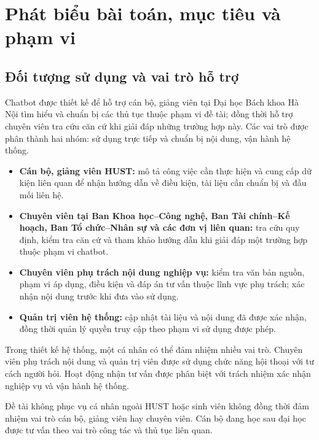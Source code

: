 \section{Phát biểu bài toán, mục tiêu và phạm vi}
\label{sec:bai-toan}
\subsection{Đối tượng sử dụng và vai trò hỗ trợ}
Chatbot được thiết kế để hỗ trợ cán bộ, giảng viên tại Đại học Bách khoa
Hà Nội tìm hiểu và chuẩn bị các thủ tục thuộc phạm vi đề tài; đồng thời
hỗ trợ chuyên viên tra cứu căn cứ khi giải đáp những trường hợp này.
Các vai trò được phân thành hai nhóm: sử dụng trực tiếp và chuẩn bị nội
dung, vận hành hệ thống.

\begin{itemize}[leftmargin=*,itemsep=2pt,topsep=3pt,before={}]
\item \textbf{Cán bộ, giảng viên HUST:} mô tả công việc cần thực hiện và cung
 cấp dữ kiện liên quan để nhận hướng dẫn về điều kiện, tài liệu cần chuẩn
 bị và đầu mối liên hệ.
\item \textbf{Chuyên viên tại Ban Khoa học--Công nghệ, Ban Tài chính--Kế
 hoạch, Ban Tổ chức--Nhân sự và các đơn vị liên quan:} tra cứu quy định,
 kiểm tra căn cứ và tham khảo hướng dẫn khi giải đáp một trường hợp thuộc
 phạm vi chatbot.
\end{itemize}

\begin{itemize}[leftmargin=*,itemsep=2pt,topsep=3pt,before={}]
\item \textbf{Chuyên viên phụ trách nội dung nghiệp vụ:} kiểm tra văn bản
 nguồn, phạm vi áp dụng, điều kiện và đáp án tư vấn thuộc lĩnh vực phụ
 trách; xác nhận nội dung trước khi đưa vào sử dụng.
\item \textbf{Quản trị viên hệ thống:} cập nhật tài liệu và nội dung đã được
 xác nhận, đồng thời quản lý quyền truy cập theo phạm vi sử dụng được phép.
\end{itemize}
Trong thiết kế hệ thống, một cá nhân có thể đảm nhiệm nhiều vai trò.
Chuyên viên phụ trách nội dung và quản trị viên được sử dụng chức năng
hội thoại với tư cách người hỏi. Hoạt động nhận tư vấn được phân biệt
với trách nhiệm xác nhận nghiệp vụ và vận hành hệ thống.

Đề tài không phục vụ cá nhân ngoài HUST hoặc sinh viên không đồng thời
đảm nhiệm vai trò cán bộ, giảng viên hay chuyên viên. Cán bộ đang học sau
đại học được tư vấn theo vai trò công tác và thủ tục liên quan.

